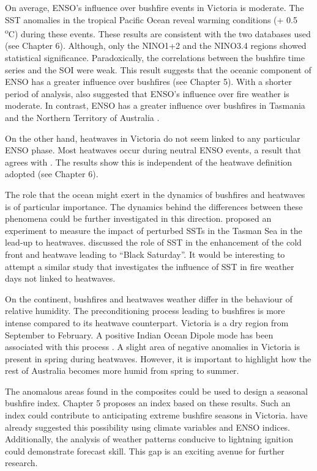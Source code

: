 On average, ENSO's influence over bushfire events in Victoria is moderate.
The SST anomalies in the tropical Pacific Ocean reveal warming conditions
(+ 0.5 \textsuperscript{o}C) during these events. These results are
consistent with the two databases used (see Chapter 6). Although,
only the NINO1+2 and the NINO3.4 regions showed statistical significance.
Paradoxically, the correlations between the bushfire time series and
the SOI were weak. This result suggests that the oceanic component
of ENSO has a greater influence over bushfires (see Chapter 5). With
a shorter period of analysis, \citet{Harris2013} also suggested that
ENSO's influence over fire weather is moderate. In contrast, ENSO
has a greater influence over bushfires in Tasmania \citep{Nicholls2007a} 
and the Northern Territory of Australia \citep{Harris2008}. 

On the other hand, heatwaves in Victoria do not seem linked to any
particular ENSO phase. Most heatwaves occur during neutral ENSO events,
a result that agrees with \citet{Boschat2014}. The results show this
is independent of the heatwave definition adopted (see Chapter 6). 

The role that the ocean might exert in the dynamics of bushfires and
heatwaves is of particular importance. The dynamics behind the differences
between these phenomena could be further investigated in this direction.
\citet{Sadler2012} proposed an experiment to measure the impact of
perturbed SSTs in the Tasman Sea in the lead-up to heatwaves. \citet{Fiddes2015}
discussed the role of SST in the enhancement of the cold front and
heatwave leading to ``Black Saturday''. It would be interesting
to attempt a similar study that investigates the influence of SST
in fire weather days not linked to heatwaves. 

On the continent, bushfires and heatwaves weather differ in the behaviour
of relative humidity. The preconditioning process leading to bushfires
is more intense compared to its heatwave counterpart. Victoria is
a dry region from September to February. A positive Indian Ocean Dipole
mode has been associated with this process \citep{Cai2009}. A slight
area of negative anomalies in Victoria is present in spring during
heatwaves. However, it is important to highlight how the rest of Australia
becomes more humid from spring to summer. 

The anomalous areas found in the composites could be used to design
a seasonal bushfire index. Chapter 5 proposes an index based on these
results. Such an index could contribute to anticipating extreme bushfire
seasons in Victoria. \citet{Harris2013} have already suggested this
possibility using climate variables and ENSO indices. Additionally,
the analysis of weather patterns conducive to lightning ignition could
demonstrate forecast skill. This gap is an exciting avenue for
further research. 

